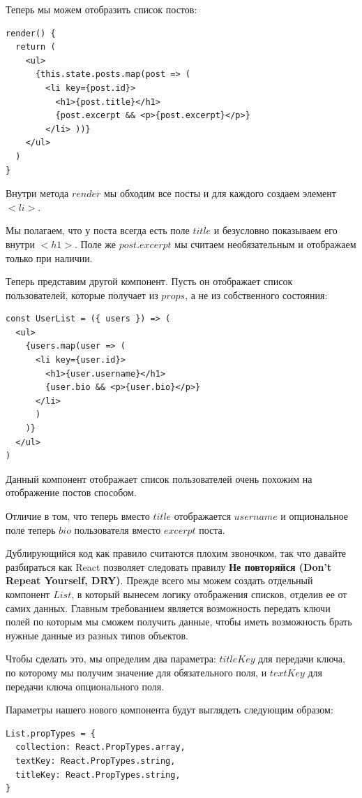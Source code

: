 Теперь мы можем отобразить список постов:

\begin{lstlisting}
render() {
  return (
    <ul>
      {this.state.posts.map(post => (
        <li key={post.id}>
          <h1>{post.title}</h1>
          {post.excerpt && <p>{post.excerpt}</p>}
        </li> ))}
    </ul> 
  )
}
\end{lstlisting}

Внутри метода $render$ мы обходим все посты и для каждого создаем элемент $<li>$.

Мы полагаем, что у поста всегда есть поле $title$ и безусловно показываем его внутри $<h1>$. Поле же $post.excerpt$ мы считаем необязательным и отображаем только при наличии.

Теперь представим другой компонент. Пусть он отображает список пользователей, которые получает из $props$, а не из собственного состояния:

\begin{lstlisting}
const UserList = ({ users }) => (
  <ul>
    {users.map(user => (
      <li key={user.id}>
        <h1>{user.username}</h1>
        {user.bio && <p>{user.bio}</p>}
      </li>
      )
    )} 
  </ul>
)
\end{lstlisting}

Данный компонент отображает список пользователей очень похожим на отображение постов способом.

Отличие в том, что теперь вместо $title$ отображается $username$ и опциональное поле теперь $bio$ пользователя вместо $excerpt$ поста. 

Дублирующийся код как правило считаются плохим звоночком, так что давайте разбираться как React позволяет следовать правилу \textbf{Не повторяйся (Don't Repeat Yourself, DRY)}. Прежде всего мы можем создать отдельный компонент $List$, в который вынесем логику отображения списков, отделив ее от самих данных. Главным требованием является возможность передать ключи полей по которым мы сможем получить данные, чтобы иметь возможность брать нужные данные из разных типов объектов.

Чтобы сделать это, мы определим два параметра: $titleKey$ для передачи ключа, по которому мы получим значение для  обязательного поля, и $textKey$ для передачи ключа опционального поля.

Параметры нашего нового компонента будут выглядеть следующим образом:

\begin{lstlisting}
List.propTypes = {
  collection: React.PropTypes.array,
  textKey: React.PropTypes.string,
  titleKey: React.PropTypes.string,
}
\end{lstlisting}

